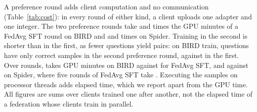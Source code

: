A preference round adds client computation and no communication
(Table~\ref{tab:cost}): in every round of either kind, a client uploads
one adapter and one integer. The two preference rounds take
 and 
times the GPU minutes of a FedAvg SFT round on BIRD and
 and 
times on Spider. Training in the second is shorter than in the first,
as fewer questions yield pairs: on BIRD train,
 questions have only correct samples
in the second preference round, against
 in the first. Over 
rounds, \method{} takes  GPU minutes on
BIRD against  for FedAvg SFT, and
 against
 on Spider, where five rounds of
FedAvg SFT take . Executing the
samples on processor threads adds elapsed time, which we report apart
from the GPU time. All figures are sums over clients trained one after
another, not the elapsed time of a federation whose clients train in
parallel.
